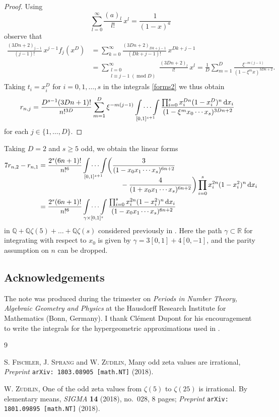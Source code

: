 \documentclass[12pt,reqno]{amsart}
\renewcommand{\d}{{\mathrm d}}
\renewcommand{\pmod}[1]{\;(\operatorname{mod}#1)}
\begin{document}
\begin{proof}
Using
$$
\sum_{l=0}^\infty\frac{(a)_l}{l!}\,x^l=\frac1{(1-x)^a}
$$
observe that
\begin{align*}
\frac{(3Dn+2)_{j-1}}{(j-1)!}\,x^{j-1}f_j(x^D)
&=\sum_{k=0}^\infty\frac{(3Dn+2)_{Dk+j-1}}{(Dk+j-1)!}\,x^{Dk+j-1}
\\
&=\sum_{\substack{l=0\\l\equiv j-1\pmod D}}^\infty\frac{(3Dn+2)_l}{l!}\,x^l
=\frac1D\sum_{m=1}^D\frac{\xi^{-m(j-1)}}{(1-\xi^mx)^{3Dn+2}}.
\end{align*}
Taking $t_i=x_i^D$ for $i=0,1,\dots,s$ in the integrals \eqref{forms2} we thus obtain
\begin{align*}
r_{n,j}
&=\frac{D^{s-1}(3Dn+1)!}{n!^{3D}}
\sum_{m=1}^D\xi^{-m(j-1)}\idotsint\limits_{[0,1]^{s+1}}
\frac{\prod_{i=0}^sx_i^{Dn}(1-x_i^D)^n\,\d x_i}{(1-\xi^mx_0\dotsb x_s)^{3Dn+2}}
\end{align*}
for each $j\in\{1,\dots,D\}$.
\end{proof}

Taking $D=2$ and $s\ge5$ odd, we obtain the linear forms
\begin{align*}
7r_{n,2}-r_{n,1}
&=\frac{2^s(6n+1)!}{n!^6}\idotsint\limits_{[0,1]^{s+1}}
\biggl(\frac3{(1-x_0x_1\dotsb x_s)^{6n+2}}
\\[-10.5pt] &\qquad\qquad\qquad\qquad\qquad\qquad
-\frac4{(1+x_0x_1\dotsb x_s)^{6n+2}}\biggr)
\prod_{i=0}^sx_i^{2n}(1-x_i^2)^n\,\d x_i
\\
&=\frac{2^s(6n+1)!}{n!^6}\idotsint\limits_{\gamma\times[0,1]^s}
\frac{\prod_{i=0}^sx_i^{2n}(1-x_i^2)^n\,\d x_i}{(1-x_0x_1\dotsb x_s)^{6n+2}}
\end{align*}
in $\mathbb Q+\mathbb Q\zeta(5)+\dots+\mathbb Q\zeta(s)$ considered previously in \cite{Zu18}.
Here the path $\gamma\subset\mathbb R$ for integrating with respect to $x_0$ is given by
$\gamma=3[0,1]+4[0,-1]$, and the parity assumption on $n$ can be dropped.

\subsection*{Acknowledgements}
The note was produced during the trimester on \emph{Periods in Number Theory, Algebraic Geometry and Physics}
at the Hausdorff Research Institute for Mathematics (Bonn, Germany).
I thank Cl\'ement Dupont for his encouragement to write the integrals for the hypergeometric approximations used in \cite{FSZ18,Zu18}.

\begin{thebibliography}{9}

\textsc{S. Fischler}, \textsc{J. Sprang} and \textsc{W. Zudilin},
Many odd zeta values are irrational,
\emph{Preprint} \texttt{arXiv:\,1803.08905 [math.NT]} (2018).

\textsc{W. Zudilin},
One of the odd zeta values from $\zeta(5)$ to $\zeta(25)$ is irrational. By elementary means,
\emph{SIGMA} \textbf{14} (2018),  no.~028, 8 pages;
\emph{Preprint} \texttt{arXiv:\,1801.09895 [math.NT]} (2018).

\end{thebibliography}
\end{document}
